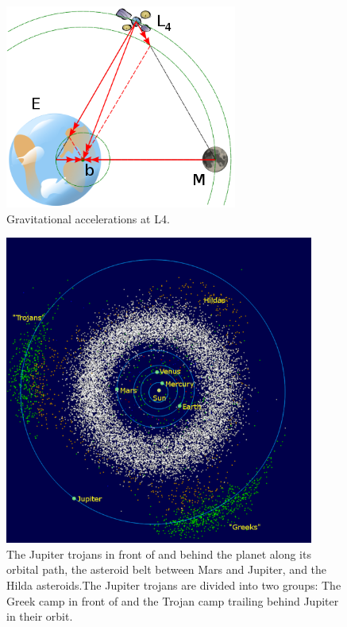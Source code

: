 \documentclass[12pt,a4paper]{article}
\begin{document}
\begin{figure}[H]
\centering
\includegraphics[width=3in]{403px-L4_diagram.png}
\caption{Gravitational accelerations at L4.}
\end{figure}


\begin{figure}[H]
\centering
\includegraphics[width=4in]{InnerSolarSystem-en.png}
\caption{The Jupiter trojans in front of and behind the planet along its orbital path, the asteroid belt between Mars and Jupiter, and the Hilda asteroids.The Jupiter trojans are divided into two groups: The Greek camp in front of and the Trojan camp trailing behind Jupiter in their orbit.}
\end{figure}
\end{document}
